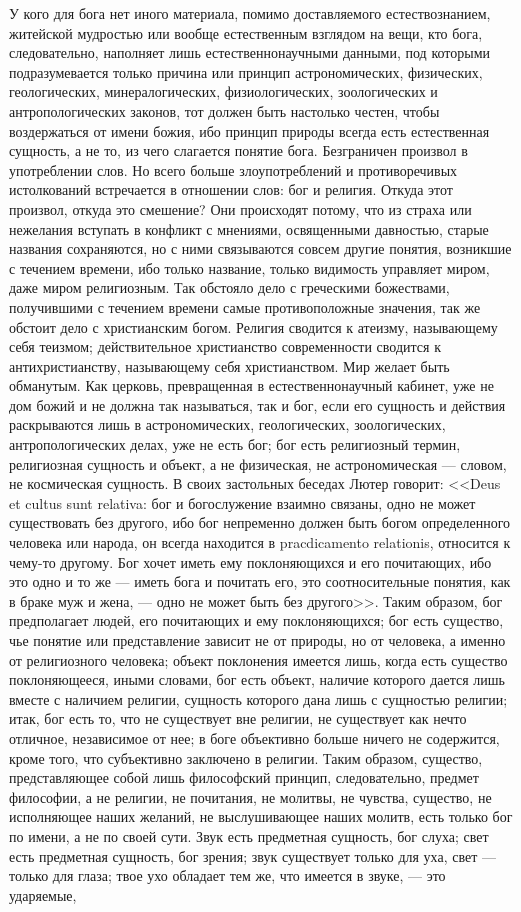 \documentclass[12pt,oneside]{book}
\begin{document}
У кого для бога нет иного материала, помимо доставляемого естествознанием, житейской мудростью или вообще естественным взглядом на вещи, кто бога, следовательно, наполняет лишь естественнонаучными данными, под которыми подразумевается только причина или принцип астрономических, физических, геологических, минералогических, физиологических, зоологических и антропологических законов, тот должен быть настолько честен, чтобы воздержаться от имени божия, ибо принцип природы всегда есть естественная сущность, а не то, из чего слагается понятие бога. Безграничен произвол в употреблении слов. Но всего больше злоупотреблений и противоречивых истолкований встречается в отношении слов: бог и религия. Откуда этот произвол, откуда это смешение? Они происходят потому, что из страха или нежелания вступать в конфликт с мнениями, освященными давностью, старые названия сохраняются, но с ними связываются совсем другие понятия, возникшие с течением времени, ибо только название, только видимость управляет миром, даже миром религиозным. Так обстояло дело с греческими божествами, получившими с течением времени самые противоположные значения, так же обстоит дело с христианским богом. Религия сводится к атеизму, называющему себя теизмом; действительное христианство современности сводится к антихристианству, называющему себя христианством. Мир желает быть обманутым. Как церковь, превращенная в естественнонаучный кабинет, уже не дом божий и не должна так называться, так и бог, если его сущность и действия раскрываются лишь в астрономических, геологических, зоологических, антропологических делах, уже не есть бог; бог есть религиозный термин, религиозная сущность и объект, а не физическая, не астрономическая --- словом, не космическая сущность. В своих застольных беседах Лютер говорит: <<Deus et cultus sunt relativa: бог и богослужение взаимно связаны, одно не может существовать без другого, ибо бог непременно должен быть богом определенного человека или народа, он всегда находится в pracdicamento relationis, относится к чему-то другому. Бог хочет иметь ему поклоняющихся и его почитающих, ибо это одно и то же --- иметь бога и почитать его, это соотносительные понятия, как в браке муж и жена, --- одно не может быть без другого>>. Таким образом, бог предполагает людей, его почитающих и ему поклоняющихся; бог есть существо, чье понятие или представление зависит не от природы, но от человека, а именно от религиозного человека; объект поклонения имеется лишь, когда есть существо поклоняющееся, иными словами, бог есть объект, наличие которого дается лишь вместе с наличием религии, сущность которого дана лишь с сущностью религии; итак, бог есть то, что не существует вне религии, не существует как нечто отличное, независимое от нее; в боге объективно больше ничего не содержится, кроме того, что субъективно заключено в религии. Таким образом, существо, представляющее собой лишь философский принцип, следовательно, предмет философии, а не религии, не почитания, не молитвы, не чувства, существо, не исполняющее наших желаний, не выслушивающее наших молитв, есть только бог по имени, а не по своей сути. Звук есть предметная сущность, бог слуха; свет есть предметная сущность, бог зрения; звук существует только для уха, свет --- только для глаза; твое ухо обладает тем же, что имеется в звуке, --- это ударяемые, 
\end{document}
